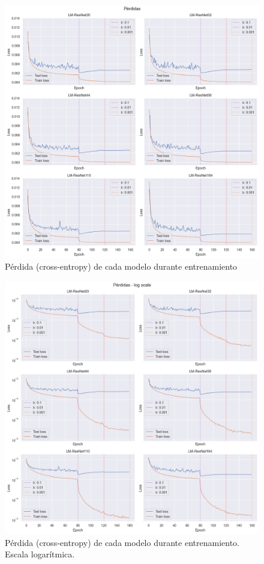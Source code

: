 \documentclass[titlepage,a4paper,oneside]{article}
\begin{document}
\begin{figure}[H]
\centering
\includegraphics[width=\textwidth]{images/loss.png}
\caption{Pérdida (cross-entropy) de cada modelo durante entrenamiento}
\label{train_loss}
\end{figure}

\begin{figure}[H]
\centering
\includegraphics[width=\textwidth]{images/loss_log.png}
\caption{Pérdida (cross-entropy) de cada modelo durante entrenamiento. Escala logarítmica.}
\label{train_loss_log}
\end{figure}
\end{document}
